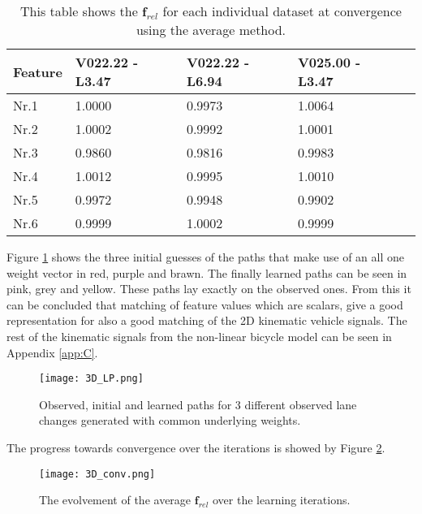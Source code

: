 \begin{table}[h!]
	\centering
	\begin{tabular}{@{}llllr@{}} \toprule
		\textbf{Feature}    & V022.22 - L3.47 & V022.22 - L6.94 & V025.00 - L3.47\\ \midrule
		Nr.1       		  &1.0000        & 0.9973 	    & 1.0064 		\\
		Nr.2              & 1.0002       & 0.9992       & 1.0001       \\
		Nr.3              & 0.9860       & 0.9816       & 0.9983       \\
		Nr.4              & 1.0012       & 0.9995       & 1.0010       \\
		Nr.5              & 0.9972       & 0.9948       & 0.9902       \\
		Nr.6              & 0.9999       & 1.0002       & 0.9999       \\ \bottomrule
	\end{tabular}
	\caption{This table shows the $\bm{f}_{rel}$ for each individual dataset at convergence using the average method.}
	\label{tab:in_av}
\end{table} 
Figure \ref{fig:3D_learned_path} shows the three initial guesses of the paths that make use of an all one weight vector in red, purple and brawn. The finally learned paths can be seen in pink, grey and yellow. These paths lay exactly on the observed ones. From this it can be concluded that matching of feature values which are scalars, give a good representation for also a good matching of the 2D kinematic vehicle signals. The rest of the kinematic signals from the non-linear bicycle model can be seen in Appendix \ref{app:C}. 
 \begin{figure}[h!]
	\centering
	\texttt{[image: 3D\_LP.png]}
	\caption{Observed, initial and learned paths for 3 different observed lane changes generated with common underlying weights.}
	\label{fig:3D_learned_path}
\end{figure}
 
The progress towards convergence over the iterations is showed by Figure \ref{fig:3D_conv}.

\begin{figure}[h!]
	\centering
	\texttt{[image: 3D\_conv.png]}
	\caption{The evolvement of the average $\bm{f}_{rel}$ over the learning iterations.}
	\label{fig:3D_conv}
\end{figure}

